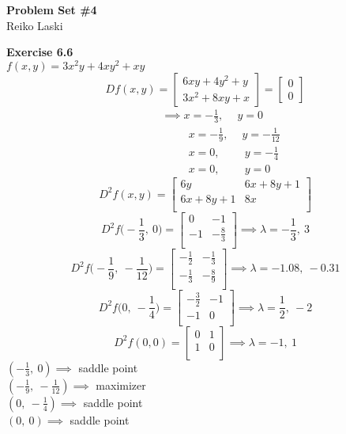 \documentclass[letterpaper,12pt]{article}
\theoremstyle{definition}
\begin{document}
\begin{flushleft}
  \textbf{\large{Problem Set \#4}} \\
  Reiko Laski
\end{flushleft}

\textbf{Exercise 6.6} \\
$f(x,y) = 3x^2y + 4xy^2 + xy$\\
\[ D f(x, y) =
\begin{bmatrix}
  6xy + 4y^2 + y \\
  3x^2 + 8xy + x
\end{bmatrix}
=
\begin{bmatrix}
  0 \\ 0
\end{bmatrix}
\]
\begin{align*}
  &\qquad\implies x = -\frac{1}{3}, \quad \ y = 0 \\
  &\qquad\qquad\ \ x = -\frac{1}{9}, \quad \ y = -\frac{1}{12} \\
  &\qquad\qquad\ \ x = 0, \qquad \ y = -\frac{1}{4} \\
  &\qquad\qquad\ \ x = 0, \qquad \ y = 0
\end{align*}
\[ D^2 f(x,y) =
\begin{bmatrix}
  6y & 6x + 8y + 1 \\
  6x + 8y + 1 & 8x \\
\end{bmatrix}
\]
\[ D^2 f\Big(-\frac{1}{3}, \ 0\Big) =
\begin{bmatrix}
  0 & -1 \\
  -1 & -\frac{8}{3} \\
\end{bmatrix}
\implies \lambda = -\frac{1}{3}, \ 3
\]
\[ D^2 f\Big(-\frac{1}{9}, \ -\frac{1}{12}\Big) =
\begin{bmatrix}
  -\frac{1}{2} & -\frac{1}{3} \\
  -\frac{1}{3} & -\frac{8}{9} \\
\end{bmatrix}
\implies \lambda = -1.08, \ -0.31
\]
\[ D^2 f\Big(0, \ -\frac{1}{4}\Big) =
\begin{bmatrix}
  -\frac{3}{2} & -1 \\
  -1 & 0 \\
\end{bmatrix}
\implies \lambda = \frac{1}{2}, \ -2
\]
\[ D^2 f(0, 0) =
\begin{bmatrix}
  0 & 1 \\
  1 & 0 \\
\end{bmatrix}
\implies \lambda = -1, \ 1
\]
$(-\frac{1}{3}, \ 0) \implies$ saddle point \\
$(-\frac{1}{9}, \ -\frac{1}{12})\implies$ maximizer \\
$(0, \ -\frac{1}{4})\implies$ saddle point \\
$(0, \ 0)\implies$ saddle point \\
\end{document}
